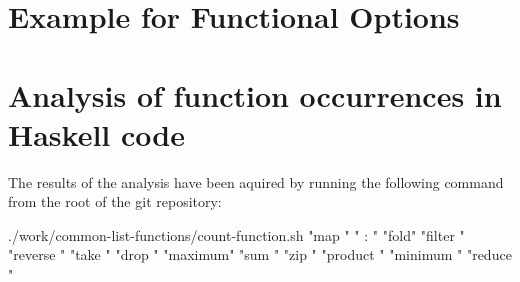 \documentclass[%
  a4paper,
  twoside,
  numbers=noenddot,
  parskip=half+,
  open=any,
  headsepline,
  english, %
  ba  %
]{zhawthesis}
\newenvironment{code}{\captionsetup{type=listing}}{}
\begin{document}
\backmatter %

\printbibliography

\renewcommand{\lstlistlistingname}{List of source codes}

\lstlistoflistings

\listoffigures

\listoftables
\printglossaries
\cleardoublepage %


\begin{appendices}

\section{Example for Functional Options}\label{appendix:funcopts}
\begin{code}
\end{code}

\section{Analysis of function occurrences in Haskell code}\label{appendix:function-occurrences}
The results of the analysis have been aquired by running the following command
from the root of the git repository\cite{git-repo}:
\begin{bashcode}
./work/common-list-functions/count-function.sh "map " " : " "fold" "filter " "reverse " "take " "drop " "maximum" "sum " "zip " "product " "minimum " "reduce "
\end{bashcode}




\end{appendices}
\end{document}
